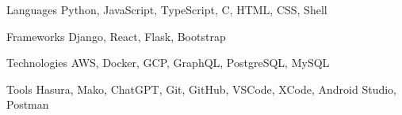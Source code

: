 
\begin{cvskills}
  \cvskill
    {Languages} %
    {Python, JavaScript, TypeScript, C, HTML, CSS, Shell} %

  \cvskill
    {Frameworks} %
    {Django, React, Flask, Bootstrap} %

  \cvskill
    {Technologies}
    {AWS, Docker, GCP, GraphQL, PostgreSQL, MySQL}

  \cvskill
    {Tools}
    {Hasura, Mako, ChatGPT, Git, GitHub, VSCode, XCode, Android Studio, Postman}
\end{cvskills}
